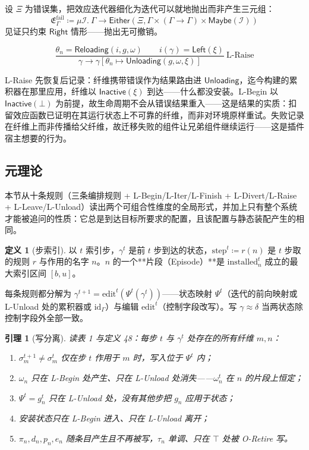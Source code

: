\documentclass[11pt,a4paper]{article}
\theoremstyle{plain}
\newtheorem{lemma}[theorem]{引理}
\theoremstyle{definition}
\newtheorem{definition}{定义}
\theoremstyle{remark}
\begin{document}
设 $\Xi$ 为错误集，把效应迭代器细化为迭代可以就地抛出而非产生三元组：
\[
\mathfrak{E}_\Gamma^{\mathrm{fail}} \coloneqq \mu\mathcal{I}.\ \Gamma \to \mathsf{Either}(\Xi, \Gamma \times (\Gamma \to \Gamma) \times \mathsf{Maybe}(\mathcal{I})) \tag{49}
\]
见证只约束 $\mathsf{Right}$ 情形——抛出无可撤销。

\[
\frac{\theta_n = \mathsf{Reloading}(i, g, \omega) \qquad i(\gamma) = \mathsf{Left}(\xi)}
{\gamma \longrightarrow \gamma[\theta_n \mapsto \mathsf{Unloading}(g, \omega, \xi)]}\ \text{L-Raise}
\]

L-Raise 先恢复后记录：纤维携带错误作为结果路由进 $\mathsf{Unloading}$，迄今构建的累积器在那里应用，纤维以 $\mathsf{Inactive}(\xi)$ 到达——什么都没安装。L-Begin 以 $\mathsf{Inactive}(\bot)$ 为前提，故生命周期不会从错误结果重入——这是结果的实质：扣留效应函数已证明在其运行状态上不可靠的纤维，而非对环境原样重试。失败记录在纤维上而非传播给父纤维，故迁移失败的组件让兄弟组件继续运行——这是插件宿主想要的行为。

\subsection{元理论}

本节从十条规则（三条编排规则 + L-Begin/L-Iter/L-Finish + L-Divert/L-Raise + L-Leave/L-Unload）读出两个可组合性维度的全局形式，并加上只有整个系统才能被追问的性质：它总是到达目标所要求的配置，且该配置与静态装配产生的相同。

\begin{definition}[步索引]
以 $t$ 索引步，$\gamma^t$ 是前 $t$ 步到达的状态，$\mathrm{step}^t \coloneqq r(n)$ 是 $t$ 步取的规则 $r$ 与作用的名字 $n$。$n$ 的一个**片段（Episode）**是 $\mathrm{installed}_n^t$ 成立的最大索引区间 $[b, u]$。
\end{definition}

每条规则都分解为 $\gamma^{t+1} = \mathrm{edit}^t(\Psi^t(\gamma^t))$——状态映射 $\Psi^t$（迭代的前向映射或 L-Unload 处的累积器或 $\mathrm{id}_\Gamma$）与编辑 $\mathrm{edit}^t$（控制字段改写）。写 $\gamma \approx \delta$ 当两状态除控制字段外全部一致。

\begin{lemma}[写分离]
读表 1 与定义 48：每步 $t$ 与 $\gamma^t$ 处存在的所有纤维 $m, n$：
\begin{enumerate}
\item $\sigma_m^{t+1} \neq \sigma_m^t$ 仅在步 $t$ 作用于 $m$ 时，写入位于 $\Psi^t$ 内；
\item $\omega_n$ 只在 L-Begin 处产生、只在 L-Unload 处消失——$\omega_n^t$ 在 $n$ 的片段上恒定；
\item $\Psi^t = g_n^t$ 只在 L-Unload 处，没有其他步把 $g_n$ 应用于状态；
\item 安装状态只在 L-Begin 进入、只在 L-Unload 离开；
\item $\pi_n, d_n, p_n, e_n$ 随条目产生且不再被写，$\tau_n$ 单调、只在 $\top$ 处被 O-Retire 写。
\end{enumerate}
\end{lemma}
\end{document}
